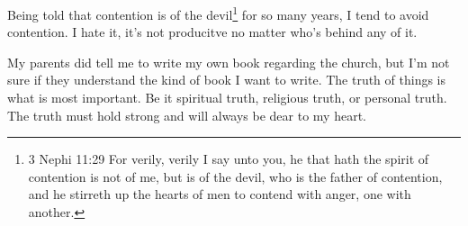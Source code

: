 Being told that contention is of the devil\footnote{
3 Nephi 11:29 For verily, verily I say unto you, he that hath the spirit of 
contention is not of me, but is of the devil, who is the father of contention, 
and he stirreth up the hearts of men to contend with anger, one with another.
} for so many years, I tend to avoid contention. I hate it, it's not producitve no 
matter who's behind any of it.

My parents did tell me to write my own book regarding the church, but I'm not sure if
they understand the kind of book I want to write. The truth of things is what is most
important. Be it spiritual truth, religious truth, or personal truth. The truth must
hold strong and will always be dear to my heart.
